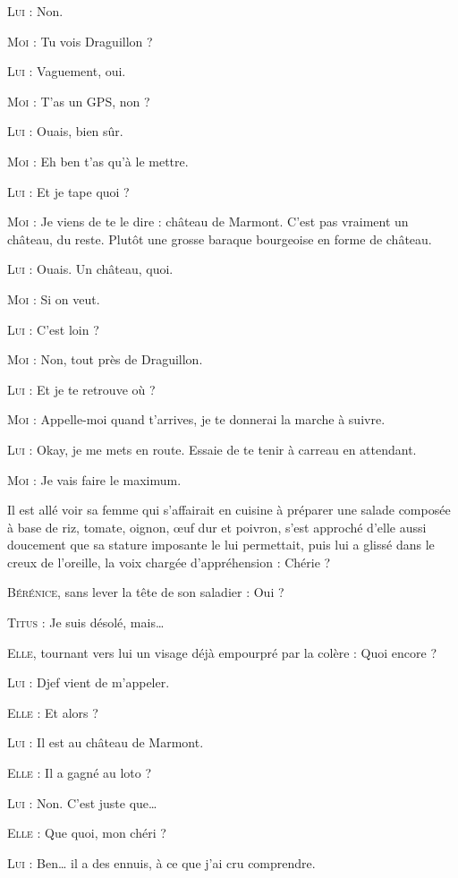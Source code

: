 \begin{dialogue}
\textsc{Lui} : Non.

\textsc{Moi} : Tu vois Draguillon ?

\textsc{Lui} : Vaguement, oui.

\textsc{Moi} : T’as un GPS, non ?

\textsc{Lui} : Ouais, bien sûr.

\textsc{Moi} : Eh ben t’as qu’à le mettre.

\textsc{Lui} : Et je tape quoi ?

\textsc{Moi} : Je viens de te le dire : château de Marmont. C’est pas vraiment un château, du reste. Plutôt une grosse baraque bourgeoise en forme de château.

\textsc{Lui} : Ouais. Un château, quoi.

\textsc{Moi} : Si on veut.

\textsc{Lui} : C’est loin ?

\textsc{Moi} : Non, tout près de Draguillon.

\textsc{Lui} : Et je te retrouve où ?

\textsc{Moi} : Appelle-moi quand t’arrives, je te donnerai la marche à suivre.

\textsc{Lui} : Okay, je me mets en route. Essaie de te tenir à carreau en attendant.

\textsc{Moi} : Je vais faire le maximum.

Il est allé voir sa femme qui s’affairait en cuisine à préparer une salade composée à base de riz, tomate, oignon, œuf dur et poivron, s’est approché d’elle aussi doucement que sa stature imposante le lui permettait, puis lui a glissé dans le creux de l’oreille, la voix chargée d’appréhension : Chérie ?

\textsc{Bérénice}, sans lever la tête de son saladier : Oui ?

\textsc{Titus} : Je suis désolé, mais…

\textsc{Elle}, tournant vers lui un visage déjà empourpré par la colère : Quoi encore ?

\textsc{Lui} : Djef vient de m’appeler.

\textsc{Elle} : Et alors ?

\textsc{Lui} : Il est au château de Marmont.

\textsc{Elle} : Il a gagné au loto ?

\textsc{Lui} : Non. C’est juste que…

\textsc{Elle} : Que quoi, mon chéri ?

\textsc{Lui} : Ben… il a des ennuis, à ce que j’ai cru comprendre.


\end{dialogue}
